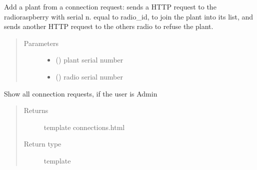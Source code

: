 \documentclass[letterpaper,10pt,english]{sphinxmanual}
\begin{document}
\begin{fulllineitems}
\label{\detokenize{index:view.connections.add_plant_from_conn}}
Add a plant from a connection request:
sends a HTTP request to the radio\sphinxhyphen{}raspberry with serial n. equal to radio\_id, to join the plant into its list,
and sends another HTTP request to the others radio to refuse the plant.
\begin{quote}\begin{description}
\item[{Parameters}] \leavevmode\begin{itemize}
\item {} 
 () \textendash{} plant serial number

\item {} 
 () \textendash{} radio serial number

\end{itemize}

\end{description}\end{quote}

\end{fulllineitems}


\begin{fulllineitems}
\label{\detokenize{index:view.connections.conn_page}}
Show all connection requests, if the user is Admin
\begin{quote}\begin{description}
\item[{Returns}] \leavevmode
template connections.html

\item[{Return type}] \leavevmode
template

\end{description}\end{quote}

\end{fulllineitems}
\end{document}
